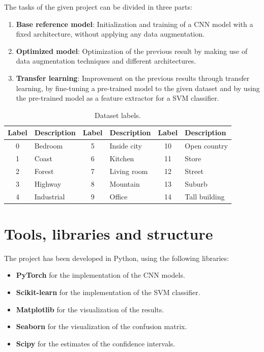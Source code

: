 \documentclass[a4paper, 11pt]{article}
\begin{document}
\vspace{10pt}

The tasks of the given project can be divided in three parts:
\begin{enumerate}
    \item \textbf{Base reference model}: Initialization and training of a CNN model with a fixed architecture, without applying any data augmentation.
    \item \textbf{Optimized model}: Optimization of the previous result by making use of data augmentation techniques and different architectures.
    \item \textbf{Transfer learning}: Improvement on the previous results through transfer learning, by fine-tuning a pre-trained model to the given dataset and by using the pre-trained model as a feature extractor for a SVM classifier.
\end{enumerate}

\pagebreak

\begin{table}[b]
    \centering
    \begin{tabular}{|c|l|c|l|c|l|}
    \hline
    Label & Description & Label & Description & Label & Description \\
    \hline
    0 & Bedroom & 5 & Inside city & 10 & Open country \\
    1 & Coast & 6 & Kitchen & 11 & Store \\
    2 & Forest & 7 & Living room & 12 & Street \\
    3 & Highway & 8 & Mountain & 13 & Suburb \\
    4 & Industrial & 9 & Office & 14 & Tall building \\
    \hline
    \end{tabular}
    \caption{Dataset labels.}
    \label{tab:labels}
\end{table}

\section{Tools, libraries and structure}
The project has been developed in Python, using the following libraries:
\begin{itemize}
    \item \textbf{PyTorch} for the implementation of the CNN models.
    \item \textbf{Scikit-learn} for the implementation of the SVM classifier.
    \item \textbf{Matplotlib} for the visualization of the results.
    \item \textbf{Seaborn} for the visualization of the confusion matrix.
    \item \textbf{Scipy} for the estimates of the confidence intervals. 
\end{itemize}
\end{document}
